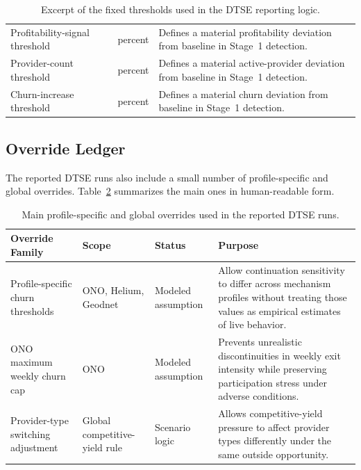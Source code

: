 \begin{table}[H]
\begin{tabularx}{\textwidth}{@{}>{\raggedright\arraybackslash}p{}>{\raggedright\arraybackslash}p{}>{\raggedright\arraybackslash}p{}X@{}}
        \addlinespace
        Profitability-signal threshold & 10 & percent & Defines a material profitability deviation from baseline in Stage~1 detection. \\
        \addlinespace
        Provider-count threshold & 5 & percent & Defines a material active-provider deviation from baseline in Stage~1 detection. \\
        \addlinespace
        Churn-increase threshold & 20 & percent & Defines a material churn deviation from baseline in Stage~1 detection. \\
        \bottomrule
    \end{tabularx}
    \caption{Excerpt of the fixed thresholds used in the DTSE reporting logic.}
    \label{tab:app_dtse_threshold_registry_excerpt}
\end{table}

\subsection{Override Ledger}
\label{app:dtse_override_ledger}
The reported DTSE runs also include a small number of profile-specific and global overrides. Table~\ref{tab:app_dtse_override_ledger} summarizes the main ones in human-readable form.

\begin{table}[H]
    \centering
    \small
    \renewcommand{\arraystretch}{1.15}
    \setlength{\tabcolsep}{4pt}
    \begin{tabularx}{\textwidth}{@{}>{\raggedright\arraybackslash}p{}>{\raggedright\arraybackslash}p{}>{\raggedright\arraybackslash}p{}X@{}}
        \toprule
        \textbf{Override Family} & \textbf{Scope} & \textbf{Status} & \textbf{Purpose} \\
        \midrule
        Profile-specific churn thresholds & ONO, Helium, Geodnet & Modeled assumption & Allow continuation sensitivity to differ across mechanism profiles without treating those values as empirical estimates of live behavior. \\
        \addlinespace
        ONO maximum weekly churn cap & ONO & Modeled assumption & Prevents unrealistic discontinuities in weekly exit intensity while preserving participation stress under adverse conditions. \\
        \addlinespace
        Provider-type switching adjustment & Global competitive-yield rule & Scenario logic & Allows competitive-yield pressure to affect provider types differently under the same outside opportunity. \\
        \bottomrule
    \end{tabularx}
    \caption{Main profile-specific and global overrides used in the reported DTSE runs.}
    \label{tab:app_dtse_override_ledger}
\end{table}

